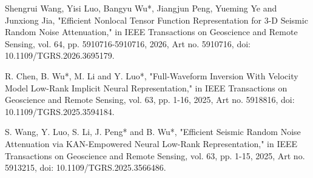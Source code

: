 Shengrui Wang, Yisi Luo, Bangyu Wu*, Jiangjun Peng, Yueming Ye and Junxiong Jia, "Efficient Nonlocal Tensor Function Representation for 3-D Seismic Random Noise Attenuation," in IEEE Transactions on Geoscience and Remote Sensing, vol. 64, pp. 5910716-5910716, 2026, Art no. 5910716, doi: 10.1109/TGRS.2026.3695179.

R. Chen, B. Wu*, M. Li and Y. Luo*, "Full-Waveform Inversion With Velocity Model Low-Rank Implicit Neural Representation," in IEEE Transactions on Geoscience and Remote Sensing, vol. 63, pp. 1-16, 2025, Art no. 5918816, doi: 10.1109/TGRS.2025.3594184.

S. Wang, Y. Luo, S. Li, J. Peng* and B. Wu*, "Efficient Seismic Random Noise Attenuation via KAN-Empowered Neural Low-Rank Representation," in IEEE Transactions on Geoscience and Remote Sensing, vol. 63, pp. 1-15, 2025, Art no. 5913215, doi: 10.1109/TGRS.2025.3566486.




